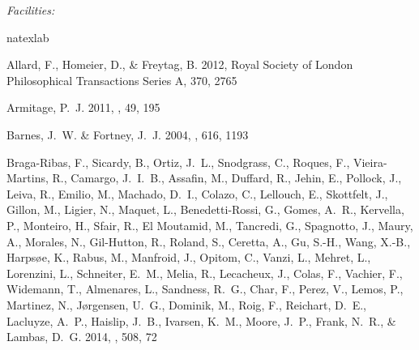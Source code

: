 \documentclass{emulateapj}
\begin{document}
{\it Facilities:} 


\begin{thebibliography}{45}
\expandafter\ifx\csname natexlab\endcsname\relax\def\natexlab#1{#1}\fi

{Allard}, F., {Homeier}, D., \& {Freytag}, B. 2012, Royal Society of London
  Philosophical Transactions Series A, 370, 2765

{Armitage}, P.~J. 2011, \araa, 49, 195

{Barnes}, J.~W. \& {Fortney}, J.~J. 2004, \apj, 616, 1193

{Braga-Ribas}, F., {Sicardy}, B., {Ortiz}, J.~L., {Snodgrass}, C., {Roques},
  F., {Vieira-Martins}, R., {Camargo}, J.~I.~B., {Assafin}, M., {Duffard}, R.,
  {Jehin}, E., {Pollock}, J., {Leiva}, R., {Emilio}, M., {Machado}, D.~I.,
  {Colazo}, C., {Lellouch}, E., {Skottfelt}, J., {Gillon}, M., {Ligier}, N.,
  {Maquet}, L., {Benedetti-Rossi}, G., {Gomes}, A.~R., {Kervella}, P.,
  {Monteiro}, H., {Sfair}, R., {El Moutamid}, M., {Tancredi}, G., {Spagnotto},
  J., {Maury}, A., {Morales}, N., {Gil-Hutton}, R., {Roland}, S., {Ceretta},
  A., {Gu}, S.-H., {Wang}, X.-B., {Harps{\o}e}, K., {Rabus}, M., {Manfroid},
  J., {Opitom}, C., {Vanzi}, L., {Mehret}, L., {Lorenzini}, L., {Schneiter},
  E.~M., {Melia}, R., {Lecacheux}, J., {Colas}, F., {Vachier}, F., {Widemann},
  T., {Almenares}, L., {Sandness}, R.~G., {Char}, F., {Perez}, V., {Lemos}, P.,
  {Martinez}, N., {J{\o}rgensen}, U.~G., {Dominik}, M., {Roig}, F., {Reichart},
  D.~E., {Lacluyze}, A.~P., {Haislip}, J.~B., {Ivarsen}, K.~M., {Moore}, J.~P.,
  {Frank}, N.~R., \& {Lambas}, D.~G. 2014, \nat, 508, 72


\end{thebibliography}
\end{document}
